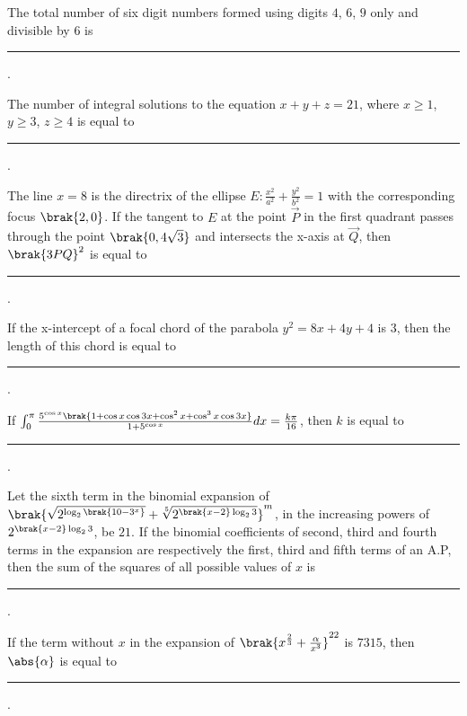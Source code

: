 \iffalse
\title{2023}
\author{EE24Btech11024 - G. Abhimanyu Koushik}
\section{integer}
\fi

\item The total number of six digit numbers formed using digits $4$, $6$, $9$ only and divisible by $6$ is \rule{1cm}{0.15mm}.

\hfill{}

\item The number of integral solutions to the equation $x+y+z=21$, where $x\geq 1$, $y\geq 3$, $z\geq 4$ is equal to \rule{1cm}{0.15mm}.

\hfill{}

\item The line $x=8$ is the directrix of the ellipse $E:\frac{x^2}{a^2}+\frac{y^2}{b^2}=1$ with the corresponding focus $\brak{2,0}$. If the tangent to $E$ at the point $\vec{P}$ in the first quadrant passes through the point $\brak{0,4\sqrt{3}}$ and intersects the x-axis at $\vec{Q}$, then $\brak{3PQ}^2$ is equal to \rule{1cm}{0.15mm}.

\hfill{}

\item If the x-intercept of a focal chord of the parabola $y^2=8x+4y+4$ is 3, then the length of this chord is equal to \rule{1cm}{0.15mm}.

\hfill{}

\item If $\int_{0}^{\pi}\frac{5^{\cos x}\brak{1+\cos x\cos 3x+\cos^{2}x+\cos^{3}x\cos 3x}}{1+5^{\cos x}}dx=\frac{k\pi}{16}$, then $k$ is equal to \rule{1cm}{0.15mm}.

\hfill{}

\item Let the sixth term in the binomial expansion of $\brak{\sqrt{2^{\log_2{\brak{10-3^x}}}}+\sqrt[5]{2^{\brak{x-2}\log_2{3}}}}^m$, in the increasing powers of $2^{\brak{x-2}\log_2{3}}$, be $21$. If the binomial coefficients of second, third and fourth terms in the expansion are respectively the first, third and fifth terms of an A.P, then the sum of the squares of all possible values of $x$ is \rule{1cm}{0.15mm}.

\hfill{}

\item If the term without $x$ in the expansion of $\brak{x^{\frac{2}{3}}+\frac{\alpha}{x^3}}^{22}$ is $7315$, then $\abs{\alpha}$ is equal to \rule{1cm}{0.15mm}.

